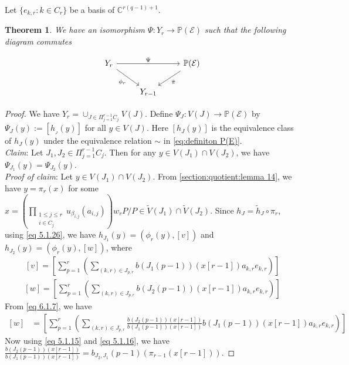 \documentclass[12pt,reqno]{amsart}
\numberwithin{equation}{section}
\newtheorem{theorem}{Theorem}[section]
\theoremstyle{definition}
\begin{document}
	Let $\{e_{k,r}:k\in C_{r}\}$ be a basis of $\mathbb{C}^{r(q-1)+1}$.
	
	\begin{theorem}\label{section:projective bundle:th 1} We have an isomorphism 
		$\Psi:Y_{r}\longrightarrow\mathbb{P}(\mathcal{E})$ such that the following diagram commutes
	
		\begin{equation}\label{eq:diagram 2}
				 \begin{tikzcd}
			Y_{r}\arrow{rr}{\Psi} \arrow[swap]{dr}{\phi_{r}} & & \mathbb{P}(\mathcal{E})\arrow{dl}{\bar{\pi}} \\%
			&	Y_{r-1}
		\end{tikzcd}
	\end{equation}
	\end{theorem}
	\begin{proof}
		We have $Y_{r}=\displaystyle\cup_{J\in\Pi_{j=1}^{r-1}C_{j}}V(J)$. Define $\Psi_{J}:V(J)\longrightarrow\mathbb{P}(\mathcal{E})$ by $\Psi_{J}(y):=[h_{_{J}}(y)]$ for all $y\in V(J)$. Here $[h_{J}(y)]$ is the equivalence class of $h_{J}(y)$ under the equivalence relation $\sim$ in \cref{eq:definiton P(E)}.\\
		{\it Claim}: Let $J_{1},J_{2}\in \Pi_{j=1}^{r-1}C_{j}$. Then for any $y\in V(J_{1})\cap V(J_{2})$, we have $\Psi_{J_{1}}(y)=\Psi_{J_{2}}(y)$.\\
		{\it Proof of claim}: Let $y\in V(J_{1})\cap V(J_{2})$. From \cref{section:quotient:lemma 14}, we have $y=\pi_{r}(x)$ for some $x=(\prod_{\substack{1\leq j\leq r\\i\in C_{j}}}u_{\beta_{i,j}}(a_{i,j}))w_{r}P/P\in \tilde{V}(J_{1})\cap \tilde{V}(J_{2})$. Since $h_{J}=\tilde{h}_{J}\circ\pi_{r}$, using \cref{eq 5.1.26}, we have
		$h_{J_{1}}(y)=(\phi_{r}(y),[v])$ and $h_{J_{2}}(y)=(\phi_{r}(y),[w])$, where 
		\begin{align}\label{eq 6.1.8}
			[v]=[\sum_{p=1}^{r}(\sum_{(k,r)\in J_{p,r}}b(J_{1}(p-1))(x[r-1])a_{k,r}e_{k,r})]
		\end{align}
		\begin{align}\label{eq 6.1.7}
			[w]=[\sum_{p=1}^{r}(\sum_{(k,r)\in J_{p,r}}b(J_{2}(p-1))(x[r-1])a_{k,r}e_{k,r})]
		\end{align}
		From \cref{eq 6.1.7}, we have
		\begin{align}\label{eq 6.1.13}
			[w]&=[\sum_{p=1}^{r}(\sum_{(k,r)\in J_{p,r}}\frac{b(J_{2}(p-1))(x[r-1])}{b(J_{1}(p-1))(x[r-1])}b(J_{1}(p-1))(x[r-1])a_{k,r}e_{k,r})]
		\end{align}
Now using \cref{eq 5.1.15} and \cref{eq 5.1.16}, we have $\frac{b(J_{2}(p-1))(x[r-1])}{b(J_{1}(p-1))(x[r-1])}=b_{J_{2},J_{1}}(p-1)(\pi_{r-1}(x[r-1]))$.

\end{proof}
\end{document}
